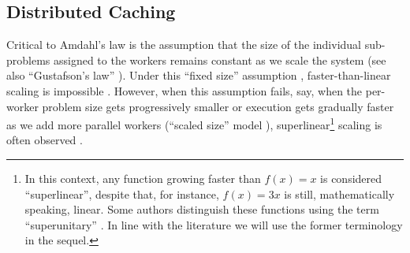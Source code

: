 


\subsection{Distributed Caching}
\label{sec:backgound-dist-cache}

Critical to Amdahl's law is the assumption that the size of the individual sub-problems assigned to the workers remains constant as we scale the system (see also ``Gustafson's law'' \cite{10.1145/42411.42415}). Under this ``fixed size'' assumption \cite{556383}, faster-than-linear scaling is impossible \cite{10.1016/0167-8191(86)90024-4}. However, when this assumption fails, say, when the per-worker problem size gets progressively smaller or execution gets gradually faster as we add more parallel workers (``scaled size'' model \cite{556383}), superlinear\footnote{In this context, any function growing faster than $f(x) = x$ is considered ``superlinear'', despite that, for instance, $f(x) = 3x$ is still, mathematically speaking, linear. Some authors distinguish these functions using the term ``superunitary'' \cite{80148}. In line with the literature we will use the former terminology in the sequel.} scaling is often observed \cite{scalability-analyzed, sdn-analytitcs, 6483679, 10.1007/978-3-319-77610-1, dobb-1, dobb-2}. 

